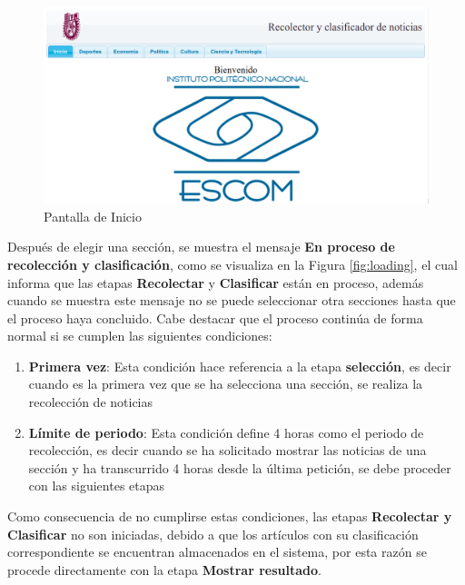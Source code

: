 \begin{figure}[H]
\centering
\includegraphics[scale=0.35]{imagenes/pantallaPrincipal.png}
\caption{Pantalla de Inicio}
\label{fig:PantallaInicio}
\end{figure}

Después de elegir una sección, se muestra el mensaje \textbf{En proceso de recolección y clasificación}, como se visualiza en la Figura \ref{fig:loading}, el cual informa que las etapas \textbf{Recolectar} y \textbf{Clasificar} están en proceso, además cuando se muestra este mensaje no se puede seleccionar otra secciones hasta que el proceso haya concluido. Cabe destacar que el proceso continúa de forma normal si se cumplen las siguientes condiciones:

\begin{enumerate}
	\item \textbf{Primera vez}: Esta condición hace referencia a la etapa \textbf{selección}, es decir cuando es la primera vez que se ha selecciona una sección, se realiza la recolección de noticias

	\item \textbf{Límite de periodo}: Esta condición define 4 horas como el periodo de recolección, es decir cuando se ha solicitado mostrar las noticias de una sección y ha transcurrido 4 horas desde la última petición, se debe proceder con las siguientes etapas
\end{enumerate}	

Como consecuencia de no cumplirse estas condiciones, las etapas \textbf{Recolectar y Clasificar} no son iniciadas, debido a que los artículos con su clasificación correspondiente se encuentran almacenados en el sistema, por esta razón se procede directamente con la etapa \textbf{Mostrar resultado}.

